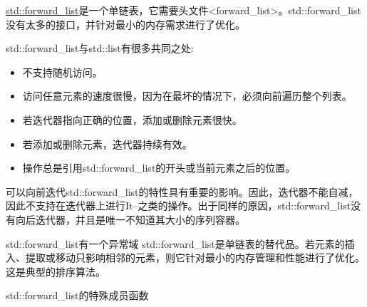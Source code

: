 

\href{http://en.cppreference.com/w/cpp/container/forward_list}{std::forward\_list}是一个单链表，它需要头文件<forward\_list>。std::forward\_list没有太多的接口，并针对最小的内存需求进行了优化。

std::forward\_list与std::list有很多共同之处:


\begin{itemize}
\item 
不支持随机访问。

\item 
访问任意元素的速度很慢，因为在最坏的情况下，必须向前遍历整个列表。

\item 
若迭代器指向正确的位置，添加或删除元素很快。

\item 
若添加或删除元素，迭代器持续有效。

\item 
操作总是引用std::forward\_list的开头或当前元素之后的位置。
\end{itemize}

可以向前迭代std::forward\_list的特性具有重要的影响。因此，迭代器不能自减，因此不支持在迭代器上进行It--之类的操作。出于同样的原因，std::forward\_list没有向后迭代器，并且是唯一不知道其大小的序列容器。

\begin{myTip}{std::forward\_list有一个异常域}
std::forward\_list是单链表的替代品。若元素的插入、提取或移动只影响相邻的元素，则它针对最小的内存管理和性能进行了优化。这是典型的排序算法。
\end{myTip}

\begin{center}
std::forward\_list的特殊成员函数
\end{center}


